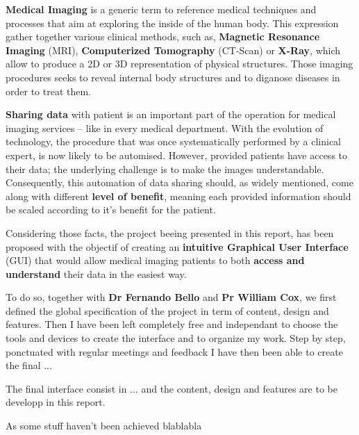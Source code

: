 \textbf{Medical Imaging} is a generic term to reference medical techniques and processes that aim at exploring the inside of the human body. This expression gather together various clinical methods, such as, \textbf{Magnetic Resonance Imaging} (MRI), \textbf{Computerized Tomography} (CT-Scan) or \textbf{X-Ray}, which allow to produce a 2D or 3D representation of physical structures. Those imaging procedures seeks to reveal internal body structures and to diganose diseases in order to treat them. 

\newline \vspace{5mm}

\textbf{Sharing data} with patient is an important part of the operation for medical imaging services -- like in every medical department.  With the evolution of technology, the procedure that was once systematically performed by a clinical expert, is now likely to be automised. However, provided patients have access to their data; the underlying challenge is to make the images understandable. Consequently, this automation  of data sharing should, as widely mentioned, come along with different \textbf{level of benefit}, meaning each provided information should be scaled according to it's benefit for the patient. 

\newline \vspace{5mm}

Considering those facts, the project beeing presented in this report, has been proposed with the objectif of creating an \textbf{intuitive Graphical User Interface} (GUI) that would allow medical imaging patients to both \textbf{access and understand} their data in the easiest way. 

\newline \vspace{5mm}
To do so, together with \textbf{Dr Fernando Bello} and \textbf{Pr William Cox}, we first defined the global specification of the project in term of content, design and features. 
Then I have been left completely free and independant to choose the tools and devices to create the interface and to organize my work.
Step by step, ponctuated with regular meetings and feedback I have then been able to create the final ... 


\newline \vspace{5mm}
The final interface consist in ... and the content, design and features are to be developp in this report.

\newline \vspace{5mm}
As some stuff haven't been achieved blablabla








